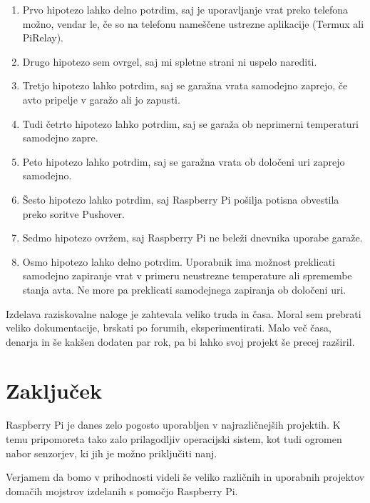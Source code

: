\documentclass[11pt]{article}
\begin{document}
\vspace{5mm}

\begin{enumerate}
  \setlength\itemsep{0.5mm}
  \item Prvo hipotezo lahko delno potrdim, saj je uporavljanje vrat preko telefona možno, vendar le, če so na telefonu nameščene ustrezne aplikacije (Termux ali PiRelay).
  \item Drugo hipotezo sem ovrgel, saj mi spletne strani ni uspelo narediti.
  \item Tretjo hipotezo lahko potrdim, saj se garažna vrata samodejno zaprejo, če avto pripelje v garažo ali jo zapusti.
  \item Tudi četrto hipotezo lahko potrdim, saj se garaža ob neprimerni temperaturi samodejno zapre.
  \item Peto hipotezo lahko potrdim, saj se garažna vrata ob določeni uri zaprejo samodejno.
  \item Šesto hipotezo lahko potrdim, saj Raspberry Pi pošilja potisna obvestila preko soritve Pushover.
  \item Sedmo hipotezo ovržem, saj Raspberry Pi ne beleži dnevnika uporabe garaže.
  \item Osmo hipotezo lahko delno potrdim. Uporabnik ima možnost preklicati samodejno zapiranje vrat v primeru neustrezne temperature ali spremembe stanja avta. Ne more pa preklicati samodejnega zapiranja ob določeni uri.
\end{enumerate}
Izdelava raziskovalne naloge je zahtevala veliko truda in časa. Moral sem prebrati veliko dokumentacije, brskati po forumih, eksperimentirati. Malo več časa, denarja in še kakšen dodaten par rok, pa bi lahko svoj projekt še precej razširil.
\newpage
\section{Zaključek}
Raspberry Pi je danes zelo pogosto uporabljen v najrazličnejših projektih. K temu pripomoreta tako zalo prilagodljiv operacijski sistem, kot tudi ogromen nabor senzorjev, ki jih je možno priključiti nanj.

Verjamem da bomo v prihodnosti videli še veliko različnih in uporabnih projektov domačih mojstrov izdelanih s pomočjo Raspberry Pi.
\newpage
\clearpage


\end{document}
